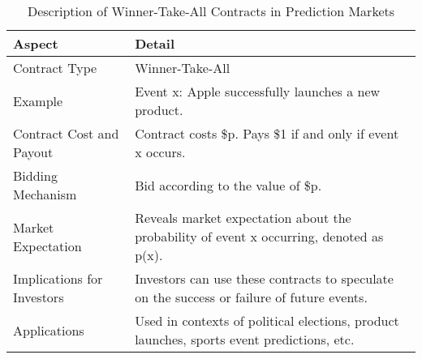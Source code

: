 \begin{table}[ht]
    \centering
    \begin{tabular}{@{}ll@{}}
        \toprule
        \textbf{Aspect}                & \textbf{Detail} \\ 
        \midrule
        Contract Type                  & Winner-Take-All \\ 
        \addlinespace
        Example                        & Event x: Apple successfully launches a new product. \\ 
        \addlinespace
        Contract Cost and Payout       & Contract costs \$p. Pays \$1 if and only if event x occurs. \\ 
        \addlinespace
        Bidding Mechanism              & Bid according to the value of \$p. \\ 
        \addlinespace
        Market Expectation             & Reveals market expectation about the probability of event x occurring, denoted as p(x). \\ 
        \addlinespace
        Implications for Investors     & Investors can use these contracts to speculate on the success or failure of future events. \\ 
        \addlinespace
        Applications                   & Used in contexts of political elections, product launches, sports event predictions, etc. \\ 
        \bottomrule
    \end{tabular}
    \caption{Description of Winner-Take-All Contracts in Prediction Markets}
\end{table}